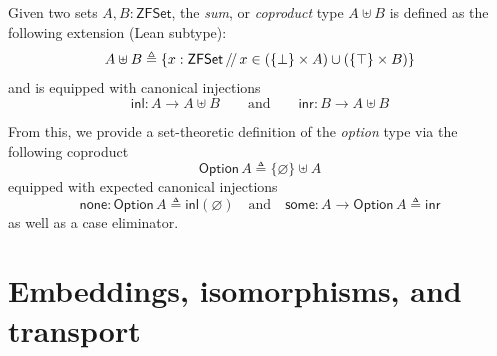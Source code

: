 \begin{definition}
  \label{def:zflean-sum}
  Given two sets $A,B : \mathsf{ZFSet}$, the \emph{sum}, or \emph{coproduct} type $A \uplus B$ is defined as the following extension (Lean subtype):
  \begin{equation*}
    A \uplus B \triangleq \{ {x : \mathsf{ZFSet} \,\slash\mkern-3mu\slash\, x \in (\{ \bot \} \times A) \cup (\{ \top \} \times B)} \}
  \end{equation*}
  and is equipped with canonical injections
  \begin{equation*}
    \mathsf{inl} : A \to A \uplus B
    \qquad\text{and}\qquad
    \mathsf{inr} : B \to A \uplus B
  \end{equation*}%
\end{definition}%
From this, we provide a set-theoretic definition of the \emph{option} type via the following coproduct
\[
\mathsf{Option}\, A \triangleq \{ \varnothing \} \uplus A
\]
equipped with expected canonical injections
\[
  \mathsf{none} : \mathsf{Option}\, A \triangleq \mathsf{inl}(\varnothing) \quad\text{and}\quad
  \mathsf{some} : A \to \mathsf{Option}\, A \triangleq \mathsf{inr}
\]
as well as a case eliminator.

\section{Embeddings, isomorphisms, and transport}
\label{subsec:iso-bridges}
